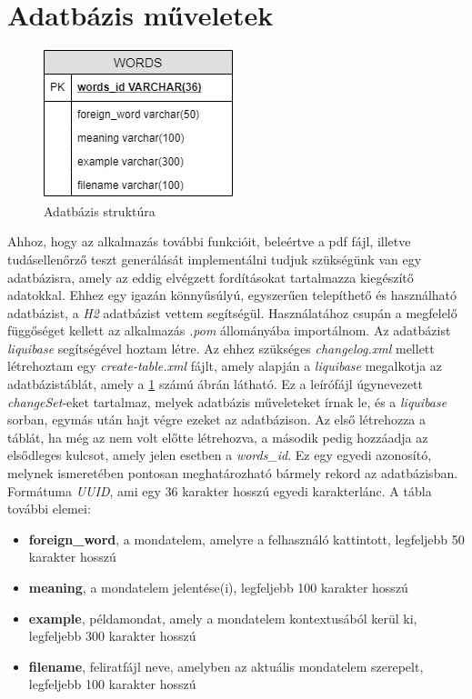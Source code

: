 \section{Adatbázis műveletek}


\begin{spacing}{1.25}
\begin{figure}[h!]
  \includegraphics[width=.5\linewidth]{images/entity.jpg}
  \centering
  \caption{Adatbázis struktúra}
  \label{fig:entity}
\end{figure}
\end{spacing}

Ahhoz, hogy az alkalmazás további funkcióit, beleértve a pdf fájl, illetve tudásellenőrző teszt generálását implementálni tudjuk szükségünk van egy adatbázisra, amely az eddig elvégzett fordításokat tartalmazza kiegészítő adatokkal. Ehhez egy igazán könnyűsúlyú, egyszerűen telepíthető és használható adatbázist, a \textit{H2} adatbázist vettem segítségül. Használatához csupán a megfelelő függőséget kellett az alkalmazás \textit{.pom} állományába importálnom. Az adatbázist \textit{liquibase} segítségével hoztam létre. Az ehhez szükséges \textit{changelog.xml} mellett létrehoztam egy \textit{create-table.xml} fájlt, amely alapján a \textit{liquibase} megalkotja az adatbázistáblát, amely a \ref{fig:entity} számú ábrán látható. Ez a leírófájl 
úgynevezett \textit{changeSet}-eket tartalmaz, melyek adatbázis műveleteket írnak le, és a \textit{liquibase} sorban, egymás után hajt végre ezeket az adatbázison. Az első létrehozza a táblát, ha még az nem volt előtte létrehozva, a második pedig hozzáadja az elsődleges kulcsot, amely jelen esetben a \textit{words\_id}. Ez egy egyedi azonosító, melynek ismeretében pontosan meghatározható bármely rekord az adatbázisban. Formátuma \textit{UUID}, ami egy 36 karakter hosszú egyedi karakterlánc. A tábla további elemei:
\begin{itemize}
\item \textbf{ foreign\_word}, a mondatelem, amelyre a felhasználó kattintott, legfeljebb 50 karakter hosszú
\item \textbf{meaning}, a mondatelem jelentése(i), legfeljebb 100 karakter hosszú
\item \textbf{example}, példamondat, amely a mondatelem kontextusából kerül ki, legfeljebb 300 karakter hosszú
\item \textbf{filename}, feliratfájl neve, amelyben az aktuális mondatelem szerepelt, legfeljebb 100 karakter hosszú
\end{itemize}

